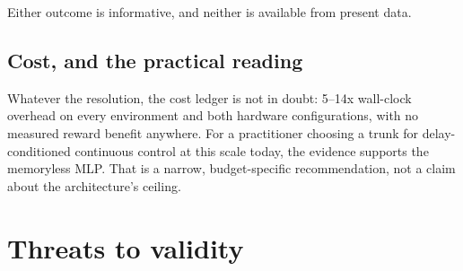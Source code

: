 \documentclass[11pt]{article}
\begin{document}
Either outcome is informative, and neither is available from present data.

\subsection{Cost, and the practical reading}

Whatever the resolution, the cost ledger is not in doubt: 5--14x wall-clock overhead on every environment and both hardware configurations, with no measured reward benefit anywhere. For a practitioner choosing a trunk for delay-conditioned continuous control at this scale today, the evidence supports the memoryless MLP. That is a narrow, budget-specific recommendation, not a claim about the architecture's ceiling.

\section{Threats to validity}
\end{document}
